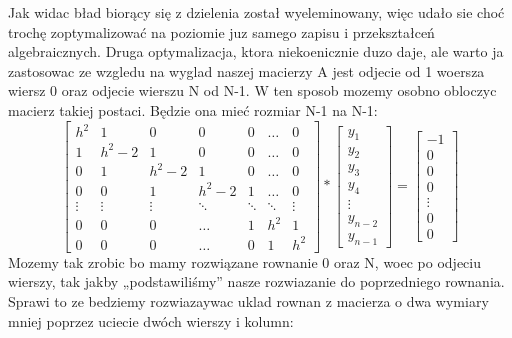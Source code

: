 \documentclass[12pt]{article}
\begin{document}
Jak widac bład biorący się z dzielenia został wyeleminowany, więc udało sie choć trochę zoptymalizować na poziomie juz samego zapisu i przekształceń algebraicznych. Druga optymalizacja, ktora niekoenicznie duzo daje, ale warto ja zastosowac ze wzgledu na wyglad naszej macierzy A jest odjecie od 1 woersza wiersz 0 oraz odjecie wierszu N od N-1. W ten sposob mozemy osobno obloczyc macierz takiej postaci. Będzie ona mieć rozmiar N-1 na N-1: 
\[
\begin{bmatrix}
    h^{2} & 1 & 0 & 0 & 0 & \dots & 0\\
    1 & h^{2}-2 & 1 & 0 & 0 & \dots & 0\\ 
    0 & 1 & h^{2}-2 & 1 & 0 & \dots & 0\\
    0 & 0 & 1 & h^{2}-2 & 1 &\dots & 0\\
    \vdots & \vdots & \vdots & \ddots & \ddots & \ddots & \vdots\\
    0 & 0 & 0 & \hdots & 1 & h^{2} & 1\\
    0 & 0 & 0 & \hdots & 0 & 1 & h^{2}
\end{bmatrix}
*
\begin{bmatrix}
    y_{1}\\
    y_{2}\\
    y_{3}\\
    y_{4}\\
    \vdots\\
    y_{n-2}\\
    y_{n-1}
\end{bmatrix}
=
\begin{bmatrix}
    -1\\
    0\\
    0\\
    0\\
    \vdots\\
    0\\
    0
\end{bmatrix}
\]
Mozemy tak zrobic bo mamy rozwiązane rownanie 0 oraz N, woec po odjeciu wierszy, tak jakby „podstawiliśmy” nasze rozwiazanie do poprzedniego rownania. Sprawi to ze bedziemy rozwiazaywac uklad rownan z macierza o dwa wymiary mniej poprzez uciecie dwóch wierszy i kolumn:
\end{document}
